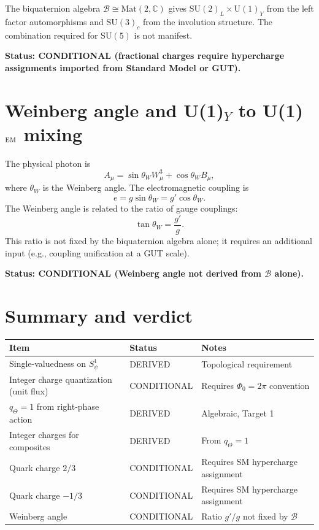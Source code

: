 \documentclass[11pt,a4paper]{article}
\begin{document}
The biquaternion algebra $\mathcal{B}\cong\mathrm{Mat}(2,\mathbb{C})$ gives
$\mathrm{SU}(2)_L\times\mathrm{U}(1)_Y$ from the left factor automorphisms and
$\mathrm{SU}(3)_c$ from the involution structure.  The combination required for
$\mathrm{SU}(5)$ is not manifest.

\textbf{Status: CONDITIONAL (fractional charges require hypercharge assignments
imported from Standard Model or GUT).}

\section{Weinberg angle and U(1)$_Y$ to U(1)$_{\rm EM}$ mixing}

The physical photon is
\begin{equation}
  A_\mu=\sin\theta_W W^3_\mu+\cos\theta_W B_\mu,
\end{equation}
where $\theta_W$ is the Weinberg angle.  The electromagnetic coupling is
\begin{equation}
  e=g\sin\theta_W=g'\cos\theta_W.
\end{equation}
The Weinberg angle is related to the ratio of gauge couplings:
\begin{equation}
  \tan\theta_W=\frac{g'}{g}.
\end{equation}
This ratio is not fixed by the biquaternion algebra alone; it requires an
additional input (e.g., coupling unification at a GUT scale).

\textbf{Status: CONDITIONAL (Weinberg angle not derived from $\mathcal{B}$
alone).}

\section{Summary and verdict}

\begin{center}
\begin{tabular}{@{}lll@{}}
\toprule
Item & Status & Notes \\
\midrule
Single-valuedness on $S^1_\psi$ & DERIVED & Topological requirement \\
Integer charge quantization (unit flux) & CONDITIONAL & Requires $\Phi_0=2\pi$ convention \\
$q_\Theta=1$ from right-phase action & DERIVED & Algebraic, Target 1 \\
Integer charges for composites & DERIVED & From $q_\Theta=1$ \\
Quark charge $2/3$ & CONDITIONAL & Requires SM hypercharge assignment \\
Quark charge $-1/3$ & CONDITIONAL & Requires SM hypercharge assignment \\
Weinberg angle & CONDITIONAL & Ratio $g'/g$ not fixed by $\mathcal{B}$ \\
\bottomrule
\end{tabular}
\end{center}
\end{document}
